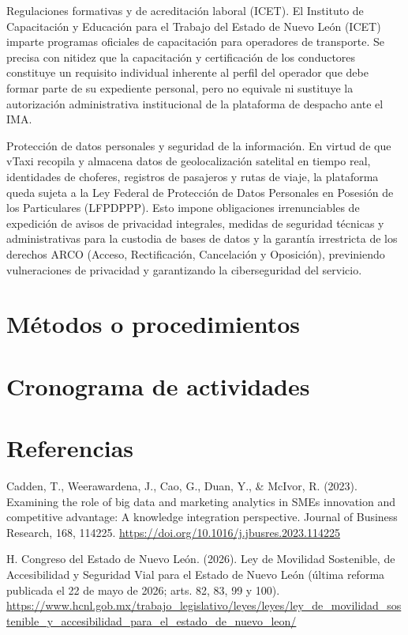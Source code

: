 {Regulaciones formativas y de acreditación laboral (ICET). El Instituto de Capacitación y Educación para el Trabajo del Estado de Nuevo León (ICET) imparte programas oficiales de capacitación para operadores de transporte. Se precisa con nitidez que la capacitación y certificación de los conductores constituye un requisito individual inherente al perfil del operador que debe formar parte de su expediente personal, pero no equivale ni sustituye la autorización administrativa institucional de la plataforma de despacho ante el IMA.


Protección de datos personales y seguridad de la información. En virtud de que vTaxi recopila y almacena datos de geolocalización satelital en tiempo real, identidades de choferes, registros de pasajeros y rutas de viaje, la plataforma queda sujeta a la Ley Federal de Protección de Datos Personales en Posesión de los Particulares (LFPDPPP). Esto impone obligaciones irrenunciables de expedición de avisos de privacidad integrales, medidas de seguridad técnicas y administrativas para la custodia de bases de datos y la garantía irrestricta de los derechos ARCO (Acceso, Rectificación, Cancelación y Oposición), previniendo vulneraciones de privacidad y garantizando la ciberseguridad del servicio.


\section{Métodos o procedimientos}
\section{Cronograma de actividades}
\clearpage\section*{Referencias}
Cadden, T., Weerawardena, J., Cao, G., Duan, Y., \& McIvor, R. (2023). Examining the role of big data and marketing analytics in SMEs innovation and competitive advantage: A knowledge integration perspective. Journal of Business Research, 168, 114225. \url{https://doi.org/10.1016/j.jbusres.2023.114225}


H. Congreso del Estado de Nuevo León. (2026). Ley de Movilidad Sostenible, de Accesibilidad y Seguridad Vial para el Estado de Nuevo León (última reforma publicada el 22 de mayo de 2026; arts. 82, 83, 99 y 100). \url{https://www.hcnl.gob.mx/trabajo_legislativo/leyes/leyes/ley_de_movilidad_sostenible_y_accesibilidad_para_el_estado_de_nuevo_leon/}


}

